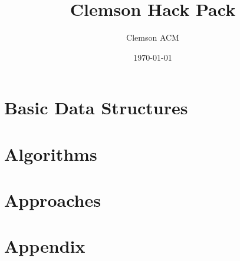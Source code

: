 \documentclass[letterpaper, 10pt]{report}
\title{Clemson Hack Pack}
\author{Clemson ACM}
\date{\today}
\begin{document}
\maketitle



\tableofcontents

\chapter{Basic Data Structures}





\chapter{Algorithms}








\chapter{Approaches}



\chapter{Appendix}







\printindex
\end{document}
